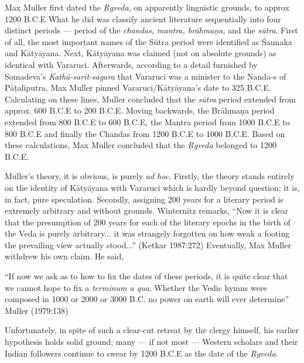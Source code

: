 Max Muller first dated the {\sl Ṛgveda}, on apparently linguistic grounds, to approx 1200 B.C.E What he did was classify ancient literature sequentially into four distinct periods --- period of the {\sl chandas, mantra, brāhmaṇa}, and the {\sl sūtra}. First of all, the most important names of the Sūtra period were identified as Śaunaka and Kātyāyana. Next, Kātyāyana was claimed (not on absolute grounds) as identical with Vararuci. Afterwards, according to a detail furnished by Somadeva’s {\sl Kathā-sarit-sāgara} that Vararuci was a minister to the Nanda-s of Pāṭalīputra, Max Muller pinned Vararuci/Kātyāyana’s date to 325 B.C.E. Calculating on these lines, Muller concluded that the {\sl sūtra} period extended from approx. 600 B.C.E to 200 B.C.E. Moving backwards, the Brāhmaṇa period extended from 800 B.C.E to 600 B.C.E, the Mantra period from 1000 B.C.E to 800 B.C.E and finally the Chandas from 1200 B.C.E to 1000 B.C.E. Based on these calculations, Max Muller concluded that the {\sl Ṛgveda} belonged to 1200 B.C.E.  

Muller’s theory, it is obvious, is purely {\sl ad hoc}. Firstly, the theory stands entirely on the identity of Kātyāyana with Vararuci which is hardly beyond question; it is, in fact, pure speculation. Secondly, assigning 200 years for a literary period is extremely arbitrary and without grounds. Winternitz remarks, “Now it is clear that the presumption of 200 years for each of the literary epochs in the birth of the Veda is purely arbitrary... it was strangely forgotten on how weak a footing the prevailing view actually stood...” (Ketkar 1987:272) Eventually, Max Muller withdrew his own claim. He said,

\begin{myquote}
“If now we ask as to how to fix the dates of these periods, it is quite clear that we cannot hope to fix a {\sl terminum a qua}. Whether the Vedic hymns were composed in 1000 or 2000 or 3000 B.C. no power on earth will ever determine”
\hfill Muller (1979:138)
\end{myquote}

Unfortunately, in spite of such a clear-cut retreat by the clergy himself, his earlier hypothesis holds solid ground; many --- if not most --- Western scholars and their Indian followers continue to swear by 1200 B.C.E as the date of the {\sl Ṛgveda}. 


